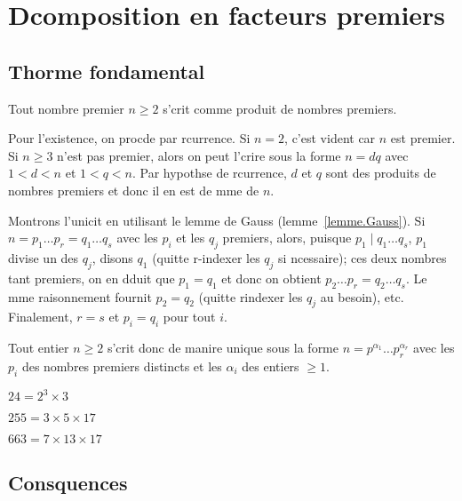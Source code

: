 \documentclass[a4paper,fleqn,openany]{trmbook}
\begin{document}
\section{Dcomposition en facteurs premiers}

\subsection{Thorme fondamental}

\begin{theoreme}\label{theoreme:TFA}
Tout nombre premier $n \geq 2$ s'crit comme produit de nombres premiers.
\end{theoreme}

\begin{demonstration}
Pour l'existence, on procde par rcurrence. Si $n = 2$, c'est vident car $n$ est premier. Si $n \geq 3$ n'est pas premier, alors on peut l'crire sous la forme $n = dq$ avec $1 < d < n$ et $1 < q < n$. Par hypothse de rcurrence, $d$ et $q$ sont des produits de nombres premiers et donc il en est de mme de $n$.

Montrons l'unicit en utilisant le lemme de Gauss (lemme~\ref{lemme.Gauss}). Si $n = p_1 \dots p_r = q_1 \dots q_s$ avec les $p_i$ et les $q_j$ premiers, alors, puisque $p_1 \mid q_1 \dots q_s$, $p_1$ divise un des $q_j$, disons $q_1$ (quitte  r-indexer les $q_j$ si ncessaire); ces deux nombres tant premiers, on en dduit que $p_1 = q_1$ et donc on obtient $p_2 \dots p_r = q_2 \dots q_s$. Le mme raisonnement fournit $p_2 = q_2$ (quitte  rindexer les $q_j$ au besoin), etc. Finalement, $r = s$ et $p_i = q_i$ pour tout $i$.
\end{demonstration}

Tout entier $n \geq 2$ s'crit donc de manire unique sous la forme $n = p^{\alpha_1} \dots p_r^{\alpha_r}$ avec les $p_i$ des nombres premiers distincts et les $\alpha_i$ des entiers $\geq 1$.

\begin{exemples}
\begin{sousexemples}
    \item $24 = 2^3 \times 3$
    \item $255 = 3 \times 5 \times 17$
    \item $663 = 7 \times 13 \times 17$
\end{sousexemples}
\end{exemples}

\subsection{Consquences}
\end{document}
